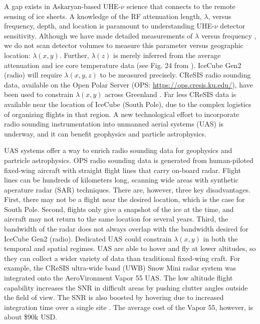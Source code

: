 \documentclass[../../main.tex]{subfiles}
\begin{document}
A gap exists in Askaryan-based UHE-$\nu$ science that connects to the remote sensing of ice sheets.  A knowledge of the RF attenuation length, $\lambda$, versus frequency, depth, and location is paramount to understanding UHE-$\nu$ detector sensitivity.  Although we have made detailed measurements of $\lambda$ versus frequency \cite{10.3189/2015jog14j214,10.3189/2015jog15j057,barwick_besson_gorham_saltzberg_2005}, we do not scan detector volumes to measure this parameter versus geographic location: $\lambda(x,y)$.  Further, $\lambda(z)$ is merely inferred from the average attenuation and ice core temperature data (see Fig. 24 from \cite{10.1016/j.astropartphys.2011.11.010}). IceCube Gen2 (radio) will require $\lambda(x,y,z)$ to be measured precisely.  CReSIS radio sounding data, available on the Open Polar Server (OPS: \url{https://ops.cresis.ku.edu/}), have been used to constrain $\lambda(x,y)$ across Greenland \cite{10.1002/2015rs005849}.  Far less CReSIS data is available near the location of IceCube (South Pole), due to the complex logistics of organizing flights in that region.  A new technological effort to incorporate radio sounding instrumentation into unmanned aerial systems (UAS) is underway, and it can benefit geophysics and particle astrophysics. \\ \vspace{2.5mm}

UAS systems offer a way to enrich radio sounding data for geophysics and partricle astrophysics.  OPS radio sounding data is generated from human-piloted fixed-wing aircraft with straight flight lines that carry on-board radar.  Flight lines can be hundreds of kilometers long, scanning wide areas with synthetic aperature radar (SAR) techniques.  There are, however, three key disadvantages.  First, there may not be a flight near the desired location, which is the case for South Pole.  Second, flights only give a snapshot of the ice at the time, and aircraft may not return to the same location for several years.  Third, the bandwidth of the radar does not always overlap with the bandwidth desired for IceCube Gen2 (radio).  Dedicated UAS could constrain $\lambda(x,y)$ in both the temporal and spatial regimes.  UAS are able to hover and fly at lower altitudes, so they can collect a wider variety of data than traditional fixed-wing craft.  For example, the CReSIS ultra-wide band (UWB) Snow Mini radar system was integrated onto the AeroVironment Vapor 55 UAS.  The low altitude flight capability increases the SNR in difficult areas by pushing clutter angles outside the field of view.  The SNR is also boosted by hovering due to increased integration time over a single site  \cite{arnold_2020}. The average cost of the Vapor 55, however, is about \$$90$k USD.  \\ \vspace{2.5mm}
\end{document}
